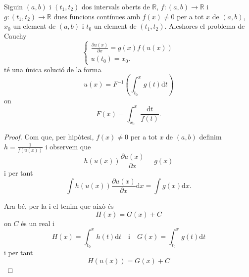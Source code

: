 \documentclass[../Apunts.tex]{subfiles}
\begin{document}
	\begin{proposition}
		\label{prop:equacions de variables separades}
		Siguin \((a,b)\) i \((t_{1},t_{2})\) dos intervals oberts de \(\mathbb{R}\), \(f\colon(a,b)\longrightarrow\mathbb{R}\) i \(g\colon(t_{1},t_{2})\longrightarrow\mathbb{R}\) dues funcions contínues amb \(f(x)\neq0\) per a tot \(x\) de \((a,b)\), \(x_{0}\) un element de \((a,b)\) i \(t_{0}\) un element de \((t_{1},t_{2})\). Aleshores el problema de Cauchy
		\begin{equation}
			\begin{cases}
				\displaystyle \frac{\partial u(x)}{\partial x}=g(x)f(u(x)) \\
				\displaystyle u(t_{0})=x_{0}.
			\end{cases}
		\end{equation}
		té una única solució de la forma
		\[u(x)=F^{-1}\left(\int_{t_{0}}^{x}g(t)\text{d}t\right)\]
		on
		\[F(x)=\int_{x_{0}}^{x}\frac{\text{d}t}{f(t)}.\]
		\begin{proof}
			Com que, per hipòtesi, \(f(x)\neq0\) per a tot \(x\) de \((a,b)\) definim \(h=\frac{1}{f(u(x))}\) i observem que
			\[h(u(x))\frac{\partial u(x)}{\partial x}=g(x)\]
			i per tant
			\[\int h(u(x))\frac{\partial u(x)}{\partial x}\text{d}{x}=\int g(x)\text{d}x.\]
			
			Ara bé, per la  i el  tenim que això és
			\[H(x)=G(x)+C\]
			on \(C\) és un real i
			\[H(x)=\int_{t_{0}}^{x}h(t)\text{d}t\quad\text{i}\quad G(x)=\int_{t_{0}}^{x}g(t)\text{d}t\]
			i per tant
			\[H(u(x))=G(x)+C\]
		\end{proof}
	\end{proposition}
\end{document}

